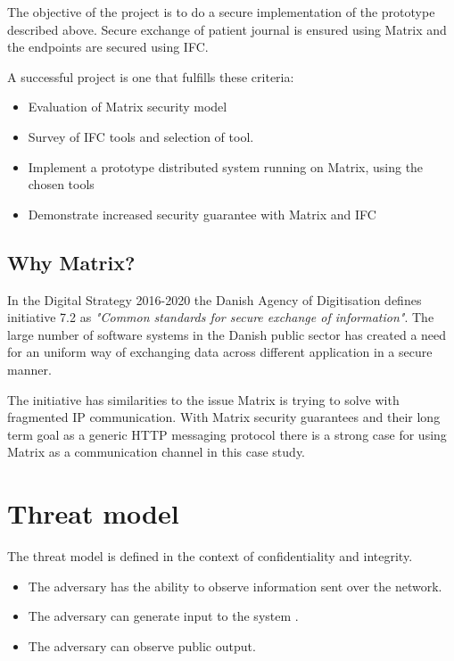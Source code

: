 The objective of the project is to do a secure implementation of the prototype described above. Secure exchange of patient journal is ensured using Matrix and the endpoints are secured using IFC.

A successful project is one that fulfills these criteria: 

\begin{itemize}
	\item Evaluation of Matrix security model
	\item Survey of IFC tools and selection of tool.
	\item Implement a prototype distributed system running on Matrix, using the chosen tools
	\item Demonstrate increased security guarantee with Matrix and IFC
\end{itemize}   


\subsection{Why Matrix?}
In the Digital Strategy 2016-2020 the Danish Agency of Digitisation defines initiative 7.2 as \emph{"Common standards for secure exchange of information"}. The large number of software systems in the Danish public sector has created a need for an uniform way of exchanging data across different application in a secure manner\cite{TheGovernment2016}. 

The initiative has similarities to the issue Matrix is trying to solve with fragmented IP communication. With Matrix security guarantees and their long term goal as a generic HTTP messaging protocol there is a strong case for using Matrix as a communication channel in this case study.


 
 
 \section{Threat model}
 The threat model is defined in the context of confidentiality and integrity.
 \begin{itemize}
 	\item The adversary has the ability to observe information sent over the network.
 	\item The adversary can generate input to the system .
 	\item The adversary can observe public output.   
 \end{itemize}
 
